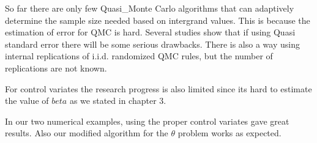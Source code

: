 
So far there are only few Quasi\_Monte Carlo algorithms that can adaptively determine the sample size needed based on intergrand values. This is because the estimation of error for QMC is hard. Several studies show that if using Quasi standard error there will be some serious drawbacks\cite{}. There is also a way using internal replications of i.i.d. randomized QMC rules, but the number of replications are not known\cite{}.

For control variates the research progress is also limited since its hard to estimate the value of $beta$ as we stated in chapter 3. 

In our two numerical examples, using the proper control variates gave great results.  Also our modified algorithm for the $\theta$ problem works as expected.   
